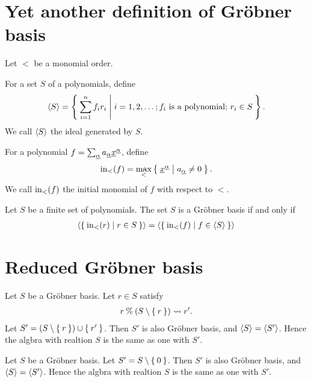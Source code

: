 \section{Yet another definition of Gr\"obner basis}
Let $<$ be a monomial order.
\begin{definition}
  For a set $S$ of a polynomials,
  define 
  \begin{align*}
    \Braket{S}=
    \Set{\sum_{i=1}^nf_ir_i|
      i=1,2,\ldots;
      \text{$f_i$ is a polynomial; }
      r_i\in S
    }.
  \end{align*}
  We call $\Braket{S}$
  the ideal  generated by $S$.
\end{definition}

\begin{definition}
  For a polynomial $f=\sum_\aaalpha a_\aaalpha \xxx^\aaalpha$,
  define 
  \begin{align*}
    \initial[<](f)=\max_<\Set{\xxx^\aaalpha|a_\aaalpha\neq 0}.
  \end{align*}
  We call $\initial[<](f)$
  the initial monomial of $f$ with respect to $<$.
\end{definition}

\begin{theorem}
  Let $S$ be a finite set of polynomials.
  The set $S$ is a Gr\"obner basis
  if and only if
  \begin{align*}
    \Braket{\Set{\initial[<](r)|r\in S}}
    =\Braket{\Set{\initial[<](f)|f\in \braket{S}}}
  \end{align*}
\end{theorem}

\section{Reduced Gr\"obner basis}
\begin{lemma}
  Let $S$ be a Gr\"obner basis.
  Let $r\in S$ satisfy
  \begin{align*}
    r\modulo (S\setminus\Set{r})\leadsto r'.
  \end{align*}
  Let $S'=(S\setminus\Set{r})\cup \Set{r'}$.
  Then
  $S'$ is also Gr\"obner basis,
  and $\Braket{S}=\Braket{S'}$.
  Hence the algbra with realtion $S$
  is the same as one with $S'$.
\end{lemma}

\begin{lemma}
  Let $S$ be a Gr\"obner basis.
  Let $S'=S\setminus \Set{0}$.
  Then
  $S'$ is also Gr\"obner basis,
  and $\Braket{S}=\Braket{S'}$.
  Hence the algbra with realtion $S$
  is the same as one with $S'$.
\end{lemma}


